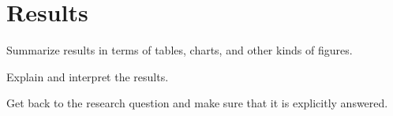 \section{Results}
\label{sec:results}

\noindent
Summarize results in terms of tables, charts, and other kinds of
figures.

Explain and interpret the results.

Get back to the research question and make sure that it is explicitly answered.
